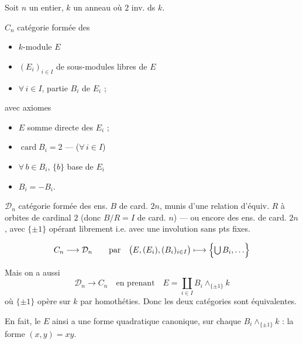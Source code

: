 \documentclass[11pt,a4paper]{article}
\begin{document}

Soit $n$ un entier, $k$ un anneau  où $2$ inv. ds $k$.

$C_n$ catégorie formée des

\begin{itemize}
  \item[] $k$-module $E$
  \item[] \struck{\ill{}} $(E_i)_{i\in I}$ de sous-modules libres de $E$
  \item[] $\forall\, i \in I$, partie $B_i$ de $E_i$ ;
\end{itemize}

avec axiomes

\begin{itemize}
  \item[a)] $E$ somme directe des $E_i$ ;
  \item[b)] $\operatorname{card} B_i = 2$ — ($\forall\, i \in I$)
  \item[c)] $\forall\, b \in B_i$, $\{b\}$ base de $E_i$
  \item[d)] $B_i = -B_i$.
\end{itemize}

$\mathcal{D}_n$ catégorie formée des ens. $B$ de card. $2n$, munis d'une
relation d'équiv. $R$ à orbites de cardinal $2$ (donc $B/R = I$ de card. $n$)
 — ou encore des ens. de card. $2n$, avec
\struck{\ill{}} $\{\pm 1\}$ opérant librement i.e. avec une involution sans pts
fixes.

\[
  C_n \longrightarrow \mathcal{D}_n \qquad \text{par} \quad
  \bigl(E, (E_i), (B_i)_{i\in I}\bigr) \longmapsto \Bigl\{\textstyle\bigcup B_i, \ldots\Bigr\}
\]

Mais on a aussi
\[
  \mathcal{D}_n \longrightarrow C_n \quad \text{en prenant} \quad
  E = \coprod_{i\in I} B_i \wedge_{\{\pm 1\}} k
\]
où $\{\pm 1\}$ opère sur $k$ par homothéties. Donc les deux catégories sont
équivalentes.



En fait, le $E$ ainsi  a  une forme
quadratique canonique, sur chaque $B_i \wedge_{\{\pm 1\}} k$ : la forme
  $(x,y) = xy$.
\end{document}
